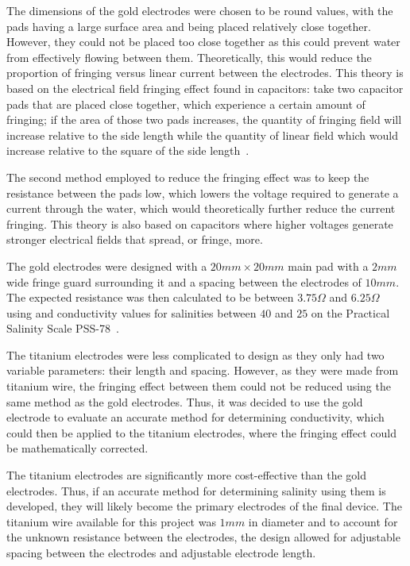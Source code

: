 The dimensions of the gold electrodes were chosen to be round values, with the pads having a large surface area and being placed relatively close together.
However, they could not be placed too close together as this could prevent water from effectively flowing between them.
Theoretically, this would reduce the proportion of fringing versus linear current between the electrodes.
This theory is based on the electrical field fringing effect found in capacitors: take two capacitor pads that are placed close together, which experience a certain amount of fringing; if the area of those two pads increases, the quantity of fringing field will increase relative to the side length while the quantity of linear field which would increase relative to the square of the side length~\cite{hegg_capacitor_electric_fringing_2004, sloggett_fringing_fields_in_disc_1986}.

The second method employed to reduce the fringing effect was to keep the resistance between the pads low, which lowers the voltage required to generate a current through the water, which would theoretically further reduce the current fringing.
This theory is also based on capacitors where higher voltages generate stronger electrical fields that spread, or fringe, more.

The gold electrodes were designed with a $20mm \times 20mm$ main pad with a $2mm$ wide fringe guard surrounding it and a spacing between the electrodes of $10mm$.
The expected resistance was then calculated to be between $3.75\Omega$ and $6.25\Omega$ using  and conductivity values for salinities between $40$ and $25$ on the Practical Salinity Scale PSS-78~\cite{ioc_teos_2010}.

The titanium electrodes were less complicated to design as they only had two variable parameters: their length and spacing.
However, as they were made from titanium wire, the fringing effect between them could not be reduced using the same method as the gold electrodes.
Thus, it was decided to use the gold electrode to evaluate an accurate method for determining conductivity, which could then be applied to the titanium electrodes, where the fringing effect could be mathematically corrected.

The titanium electrodes are significantly more cost-effective than the gold electrodes. 
Thus, if an accurate method for determining salinity using them is developed, they will likely become the primary electrodes of the final device.  
The titanium wire available for this project was $1mm$ in diameter and to account for the unknown resistance between the electrodes, the design allowed for adjustable spacing between the electrodes and adjustable electrode length.

